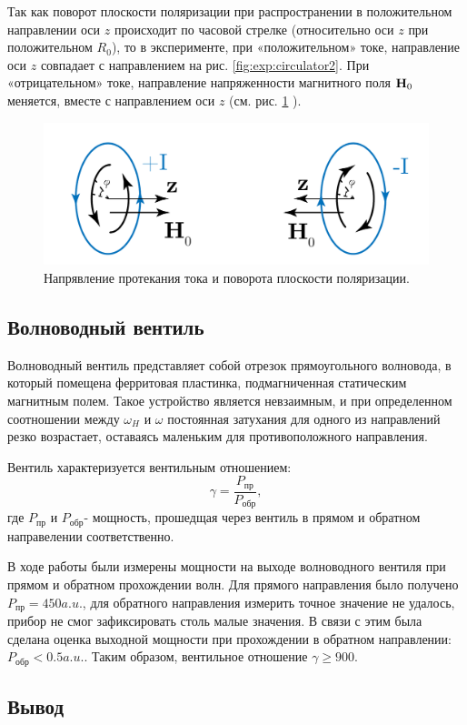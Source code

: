 Так как поворот плоскости поляризации при распространении в положительном направлении оси $z$ происходит по часовой
стрелке (относительно оси $z$ при положительном $R_0$), то в эксперименте, при «положительном» токе, направление оси $z$ совпадает с
направлением на рис. \ref{fig:exp:circulator2}. При «отрицательном» токе, направление напряженности магнитного поля
$\textbf{H}_0$ меняется, вместе с направлением оси $z$ (см. рис. \ref{fig:exp:circulator3} ).
\begin{figure}[h!]
    \centering
    \includegraphics[width = 0.7\linewidth]{imgs/circulator3.pdf}
    \caption{Напрявление протекания тока и поворота плоскости поляризации.}
    \label{fig:exp:circulator3}
\end{figure}
\subsection{Волноводный вентиль}
Волноводный вентиль представляет собой отрезок прямоугольного волновода, в который помещена ферритовая пластинка,
подмагниченная статическим магнитным полем. Такое устройство является невзаимным, и при определенном соотношении между
$\omega_{H}$ и $\omega$ постоянная затухания для одного из направлений резко возрастает, оставаясь маленьким для
противоположного направления.

Вентиль характеризуется вентильным отношением:
\begin{equation}
    \gamma = \frac{P_{\text{пр}}}{P_{\text{обр}}},
    \label{eq:3:1}
\end{equation}
где $P_{\text{пр}}$ и $P_{\text{обр}}$- мощность, прошедщая через вентиль в прямом и обратном направелении
соответственно.

В ходе работы были измерены мощности на выходе волноводного вентиля при прямом и обратном прохождении волн. Для прямого
направления было получено $P_{\text{пр}} = 450 a.u.$, для обратного направления измерить точное значение не удалось,
прибор не смог зафиксировать столь малые значения. В связи с этим была сделана оценка выходной мощности при прохождении
в обратном направлении: $P_{\text{обр}}<0.5 a.u.$. Таким образом, вентильное отношение $\gamma \geq 900$. 
\subsection{Вывод}


